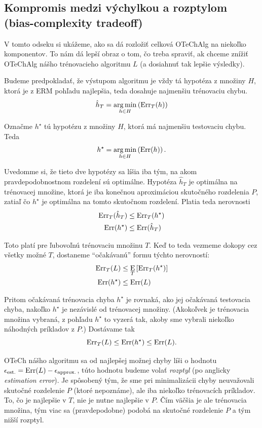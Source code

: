 \subsection{Kompromis medzi výchylkou a rozptylom (bias-complexity tradeoff)}

V tomto odseku si ukážeme, ako sa dá rozložiť celková OTeChAlg na niekoľko
komponentov. To nám dá lepší obraz o tom, čo treba spraviť, ak chceme
znížiť OTeChAlg nášho trénovacieho algoritmu $L$ (a dosiahnuť tak lepšie výsledky).

Budeme predpokladať, že výstupom algoritmu je vždy tá hypotéza z množiny
$H$, ktorá je z ERM pohľadu najlepšia, teda dosahuje najmenšiu trénovaciu
chybu.
$$ \hat{h}_T = \operatorname*{{arg\,min}}_{h \in H} \left( \mathrm{Err}_T(h) \right) $$

Označme $h^\star$ tú hypotézu z množiny $H$, ktorá má najmenšiu testovaciu
chybu. Teda
$$ h^\star = \operatorname*{{arg\,min}}_{h \in H} \left( \mathrm{Err}(h) \right). $$

Uvedomme si, že tieto dve hypotézy sa líšia iba tým, na akom
pravdepodobnostnom rozdelení sú optimálne. Hypotéza $\hat{h}_T$
je optimálna na trénovacej množine, ktorá je iba konečnou aproximáciou
skutočného rozdelenia $P$, zatiaľ čo $h^\star$ je optimálna na tomto
skutočnom rozdelení. Platia teda nerovnosti
\begin{align*}
  \mathrm{Err}_T(\hat{h}_T) &\leq \mathrm{Err}_T(h^\star) \\
  \mathrm{Err}(h^\star) &\leq \mathrm{Err}(\hat{h}_T)
\end{align*}

Toto platí pre ľubovoľnú trénovaciu množinu $T$. Keď to teda vezmeme
dokopy cez všetky možné $T$, dostaneme ``očakávanú'' formu týchto
nerovností:
\begin{align*}
  \mathrm{Err}_T(L) &\leq \operatorname*{\mathrm{E}}_T \left[ \mathrm{Err}_T(h^\star) \right] \\
  \mathrm{Err}(h^\star) &\leq \mathrm{Err}(L)
\end{align*}

Pritom očakávaná trénovacia chyba $h^\star$ je rovnaká, ako jej očakávaná
testovacia chyba, nakoľko $h^\star$ je nezávislé od trénovacej množiny.
(Akokoľvek je trénovacia množina vybraná, z pohľadu $h^\star$ to vyzerá
tak, akoby sme vybrali niekoľko náhodných príkladov z $P$.) Dostávame tak
$$ \mathrm{Err}_T(L) \leq \mathrm{Err}(h^\star) \leq \mathrm{Err}(L). $$

OTeCh nášho algoritmu sa od najlepšej možnej chyby líši o hodnotu
${\epsilon_\text{est.}} = \mathrm{Err}(L) - {\epsilon_\text{approx.}}$, túto hodnotu budeme volať
\emph{rozptyl} (po anglicky \emph{estimation error}). Je spôsobený tým,
že sme pri minimalizácii chyby neuvažovali skutočné rozdelenie $P$
(ktoré nepoznáme), ale iba niekoľko trénovacích príkladov. To, čo je
najlepšie v $T$, nie je nutne najlepšie v $P$. Čím väčšia je ale
trénovacia množina, tým viac sa (pravdepodobne) podobá na skutočné
rozdelenie $P$ a tým nižší rozptyl.

